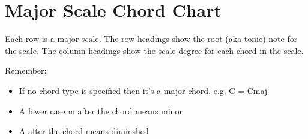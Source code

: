 \documentclass{article}
\begin{document}
\setlength{\parindent}{0pt}


\section{Major Scale Chord Chart}

Each row is a major scale.  The row headings show the root (aka tonic) note for the scale.  The column headings show the scale degree for each chord in the scale.

\bigskip

Remember:
\begin{itemize}
    \item If no chord type is specified then it's a major chord, e.g. C = Cmaj
    \item A lower case m after the chord means minor
    \item A \textsuperscript{\circ} after the chord means diminshed
\end{itemize}
\end{document}
